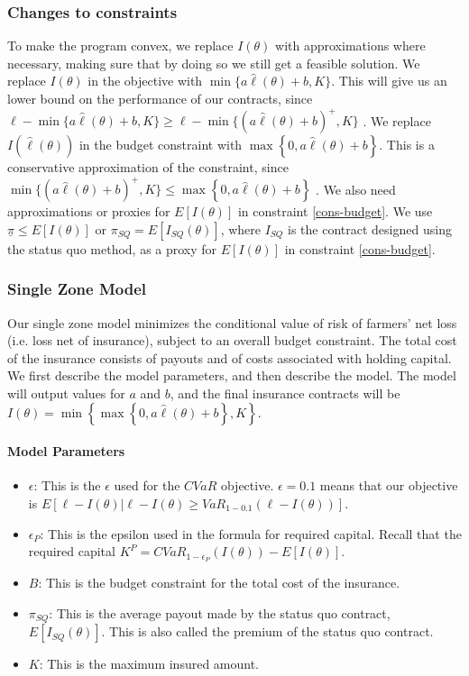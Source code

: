 \documentclass[11pt]{article}
\begin{document}
  \subsubsection{Changes to constraints}
  To make the program convex, we replace $I(\theta)$ with approximations where necessary, making sure that by doing so we still get a feasible solution. We replace $I(\theta)$ in the objective with $\min \{ a\hat{\ell}(\theta) + b,K \}$. This will give us an lower bound on the performance of our contracts, since $\ell - \min \{ a\hat{\ell}(\theta) + b,K \} \geq  \ell - \min \{ (a\hat{\ell}(\theta) + b)^+,K \}$ . We replace $I(\hat{\ell}(\theta))$ in the budget constraint with $\max \left \{ 0,a\hat{\ell}(\theta) + b \right \} $. This is a conservative approximation of the constraint, since $\min \{ (a\hat{\ell}(\theta) + b)^+,K \}  \leq \max \left \{ 0,a\hat{\ell}(\theta) + b \right \}$ . We also need approximations or proxies for $E[I(\theta)]$ in constraint \ref{cons-budget}. We use $\underline{\pi} \leq E[I(\theta)]$ or $\pi_{SQ} = E[I_{SQ}(\theta)]$, where $I_{SQ}$ is the contract designed using the status quo method, as a proxy for $E[I(\theta)]$ in constraint \ref{cons-budget}. 
  
  \subsubsection{Single Zone Model}
  Our single zone model minimizes the conditional value of risk of farmers' net loss (i.e. loss net of insurance), subject to an overall budget constraint. The total cost of the insurance consists of payouts and of costs associated with holding capital. We first describe the model parameters, and then describe the model. The model will output values for $a$ and $b$, and the final insurance contracts will be $I(\theta) = \min \left \{\max \left \{0,a\hat{\ell}(\theta) + b \right \}, K \right \}$.
  \paragraph*{Model Parameters}
  \begin{itemize}
    \item $\epsilon$: This is the $\epsilon$ used for the $CVaR$ objective.  $\epsilon = 0.1$ means that our objective is $E[\ell - I(\theta)|\ell -I(\theta) \geq VaR_{1-0.1}\left ( \ell - I(\theta) \right )]$. 
    \item $\epsilon_P$: This is the epsilon used in the formula for required capital. Recall that the required capital $K^P = CVaR_{1-\epsilon_P}(I(\theta)) - E[I(\theta)]$.
    \item $B$: This is the budget constraint for the total cost of the insurance.
    \item $\pi_{SQ}$: This is the average payout made by the status quo contract, $E[I_{SQ}(\theta)]$. This is also called the premium of the status quo contract.  
    \item $K$: This is the maximum insured amount.
\end{itemize}
  
\end{document}
